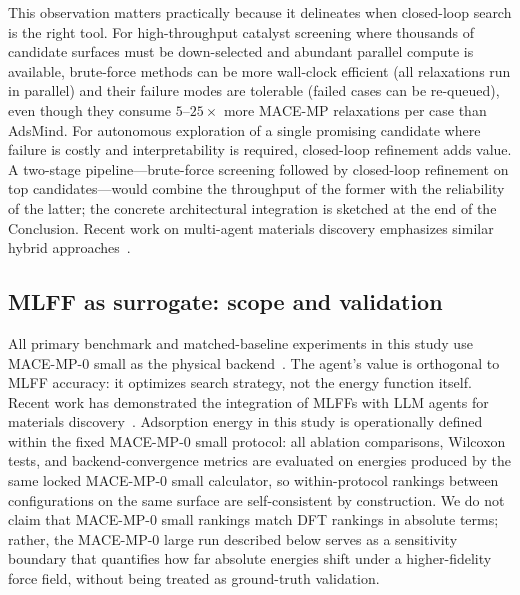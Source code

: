 This observation matters practically because it delineates when closed-loop search is the right tool.
For high-throughput catalyst screening where thousands of candidate surfaces must be down-selected and abundant parallel compute is available, brute-force methods can be more wall-clock efficient (all relaxations run in parallel) and their failure modes are tolerable (failed cases can be re-queued), even though they consume $5$--$25\times$ more MACE-MP relaxations per case than AdsMind.
For autonomous exploration of a single promising candidate where failure is costly and interpretability is required, closed-loop refinement adds value.
A two-stage pipeline---brute-force screening followed by closed-loop refinement on top candidates---would combine the throughput of the former with the reliability of the latter; the concrete architectural integration is sketched at the end of the Conclusion.
Recent work on multi-agent materials discovery emphasizes similar hybrid approaches~\cite{zhang2026towards}.

\subsection{MLFF as surrogate: scope and validation}

All primary benchmark and matched-baseline experiments in this study use MACE-MP-0 small as the physical backend~\cite{batatia2023foundation,deng2023chgnet}.
The agent's value is orthogonal to MLFF accuracy: it optimizes search strategy, not the energy function itself.
Recent work has demonstrated the integration of MLFFs with LLM agents for materials discovery~\cite{zhang2026matclaw}.
Adsorption energy in this study is operationally defined within the fixed MACE-MP-0 small protocol: all ablation comparisons, Wilcoxon tests, and backend-convergence metrics are evaluated on energies produced by the same locked MACE-MP-0 small calculator, so within-protocol rankings between configurations on the same surface are self-consistent by construction.
We do not claim that MACE-MP-0 small rankings match DFT rankings in absolute terms; rather, the MACE-MP-0 large run described below serves as a sensitivity boundary that quantifies how far absolute energies shift under a higher-fidelity force field, without being treated as ground-truth validation.

